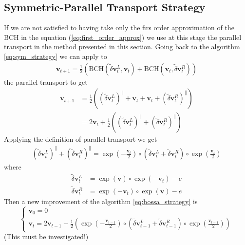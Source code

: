 \subsection{Symmetric-Parallel Transport Strategy}
If we are not satisfied to having take only the firs order approximation of the BCH in the equation (\ref{eq:first_order_approx}) we use at this stage the parallel transport in the method presented in this section.
Going back to the algorithm \ref{eq:sym_strategy} we can apply to
\begin{align*}
\mathbf{v}_{t+1} = \frac{1}{2}(\text{BCH}(\tilde{\delta} \mathbf{v}^{L}_{t}, \mathbf{v}_{t}) + \text{BCH}(\mathbf{v}_{t},\tilde{\delta} \mathbf{v}^{R}_{t}))
\end{align*}
the parallel transport to get
\begin{align*}
\mathbf{v}_{t+1} &= \frac{1}{2}((\tilde{\delta} \mathbf{v}^{L}_{t})^{\parallel} + \mathbf{v}_{t} + \mathbf{v}_{t} + (\tilde{\delta} \mathbf{v}^{R}_{t})^{\parallel}) \\
&= 2\mathbf{v}_{t} + \frac{1}{2}((\tilde{\delta} \mathbf{v}^{L}_{t})^{\parallel} + (\tilde{\delta} \mathbf{v}^{R}_{t})^{\parallel})
\end{align*}
Applying the definition of parallel transport we get
\begin{align*}
(\tilde{\delta} \mathbf{v}^{L}_{t})^{\parallel} + (\tilde{\delta} \mathbf{v}^{R}_{t})^{\parallel} 
= 
\exp(-\frac{\mathbf{v}_{t}}{2}) \circ (\tilde{\delta} \mathbf{v}^{L}_{t} +\tilde{\delta} \mathbf{v}^{R}_{t} )\circ \exp(\frac{\mathbf{v}_{t}}{2})
\end{align*}
where 
\begin{align*}
\tilde{\delta} \mathbf{v}^{L}_{t} &=  \exp(\mathbf{v})\circ \exp(-\mathbf{v}_{t}) - e \\
\tilde{\delta} \mathbf{v}^{R}_{t} &=  \exp(-\mathbf{v}_{t})\circ \exp(\mathbf{v}) - e
\end{align*}
Then a new improvement of the algorithm \ref{eq:bossa_strategy}  is
\begin{equation}\label{eq:sym_parallel_strategy}
\begin{cases}
\mathbf{v}_0 = 0 \\
\mathbf{v}_{t} 
=  
2\mathbf{v}_{t-1} + \frac{1}{2}(\exp(-\frac{\mathbf{v}_{t-1}}{2}) 
\circ 
(\tilde{\delta} \mathbf{v}^{L}_{t-1} +\tilde{\delta} \mathbf{v}^{R}_{t-1} )\circ \exp(\frac{\mathbf{v}_{t-1}}{2}))
\end{cases}
\end{equation}
(This must be investigated!)